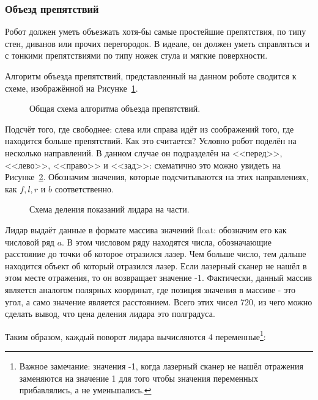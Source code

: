 \subsubsection{Объезд препятствий} \label{subsub:obstacle-avoidance}

Робот должен уметь объезжать хотя-бы самые простейшие препятствия, по типу стен, диванов или прочих перегородок. В идеале, он должен уметь справляться и с тонкими препятствиями по типу ножек стула и мягкие поверхности.

Алгоритм объезда препятствий, представленный на данном роботе сводится к схеме, изображённой на Рисунке~\ref{fig:algorithm-obstacle}.

\begin{figure}[ht]
  \caption{Общая схема алгоритма объезда препятствий.}\label{fig:algorithm-obstacle}
\end{figure}

Подсчёт того, где свободнее: слева или справа идёт из соображений того, где находится больше препятствий. Как это считается? Условно робот поделён на несколько направлений. В данном случае он подразделён на <<перед>>, <<лево>>, <<право>> и <<зад>>: схематично это можно увидеть на Рисунке~\ref{fig:robot-parts}. Обозначим значения, которые подсчитываются на этих направлениях, как $f, l, r$ и $b$ соответственно.

\begin{figure}[ht]
  \caption{Схема деления показаний лидара на части.}\label{fig:robot-parts}
\end{figure}

Лидар выдаёт данные в формате массива значений float: обозначим его как числовой ряд $a$. В этом числовом ряду находятся числа, обозначающие расстояние до точки об которое отразился лазер. Чем больше число, тем дальше находится объект об который отразился лазер. Если лазерный сканер не нашёл в этом месте отражения, то он возвращает значение -1. Фактически, данный массив является аналогом полярных координат, где позиция значения в массиве - это угол, а само значение является расстоянием. Всего этих чисел 720, из чего можно сделать вывод, что цена деления лидара это полградуса. 

Таким образом, каждый поворот лидара вычисляются 4 переменные\footnote{Важное замечание: значения -1, когда лазерный сканер не нашёл отражения заменяются на значение 1 для того чтобы значения переменных прибавлялись, а не уменьшались.}:

